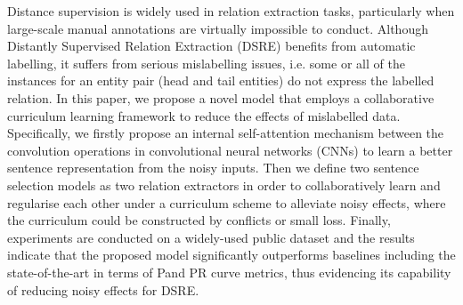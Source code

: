 Distance supervision is widely used in relation extraction tasks, particularly when large-scale manual annotations are virtually impossible to conduct. Although Distantly Supervised Relation Extraction (DSRE) benefits from automatic labelling, it suffers from serious mislabelling issues, i.e. some or all of the instances for an entity pair (head and tail entities) do not express the labelled relation. In this paper, we propose a novel model that employs a collaborative curriculum learning framework to reduce the effects of mislabelled data. Specifically, we firstly propose an internal self-attention mechanism between the convolution operations in convolutional neural networks (CNNs) to learn a better sentence representation from the noisy inputs. Then we define two sentence selection models as two relation extractors in order to collaboratively learn and regularise each other under a curriculum scheme to alleviate noisy effects, where the curriculum could be constructed by conflicts or small loss. Finally, experiments are conducted on a widely-used public dataset and the results indicate that the proposed model significantly outperforms baselines including the state-of-the-art in terms of P\@N and PR curve metrics, thus evidencing its capability of reducing noisy effects for DSRE.